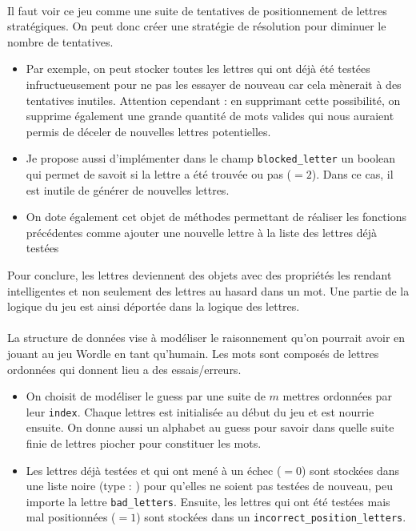 \documentclass[10pt,a4paper,hidelinks]{article}
\begin{document}
\paragraph{} Il faut voir ce jeu comme une suite de tentatives de positionnement de lettres stratégiques. On peut donc créer une stratégie de résolution pour diminuer le nombre de tentatives.
\begin{itemize}
    \item Par exemple, on peut stocker toutes les lettres qui ont déjà été testées infructueusement pour ne pas les essayer de nouveau car cela mènerait à des tentatives inutiles. Attention cependant : en supprimant cette possibilité, on supprime également une grande quantité de mots valides qui nous auraient permis de déceler de nouvelles lettres potentielles.
    \item Je propose aussi d'implémenter dans le champ \verb|blocked_letter| un boolean qui permet de savoit si la lettre a été trouvée ou pas ($=2$). Dans ce cas, il est inutile de générer de nouvelles lettres.
\end{itemize}


\begin{itemize}
    \item On dote également cet objet de méthodes permettant de réaliser les fonctions précédentes comme ajouter une nouvelle lettre à la liste des lettres déjà testées
\end{itemize}

Pour conclure, les lettres deviennent des objets avec des propriétés les rendant intelligentes et non seulement des lettres au hasard dans un mot. Une partie de la logique du jeu est ainsi déportée dans la logique des lettres.


\paragraph{} La structure de données vise à modéliser le raisonnement qu'on pourrait avoir en jouant au jeu Wordle en tant qu'humain. Les mots sont composés de lettres ordonnées qui donnent lieu a des essais/erreurs.
\begin{itemize}
    \item On choisit de modéliser le guess par une suite de $m$ mettres ordonnées par leur \verb|index|. Chaque lettres est initialisée au début du jeu et est nourrie ensuite. On donne aussi un alphabet au guess pour savoir dans quelle suite finie de lettres piocher pour constituer les mots.
    \item Les lettres déjà testées et qui ont mené à un échec ($=0$) sont stockées dans une liste noire (type : ) pour qu'elles ne soient pas testées de nouveau, peu importe la lettre \verb|bad_letters|. Ensuite, les lettres qui ont été testées mais mal positionnées ($=1$) sont stockées dans un  \verb|incorrect_position_letters|.
\end{itemize}

\end{document}
